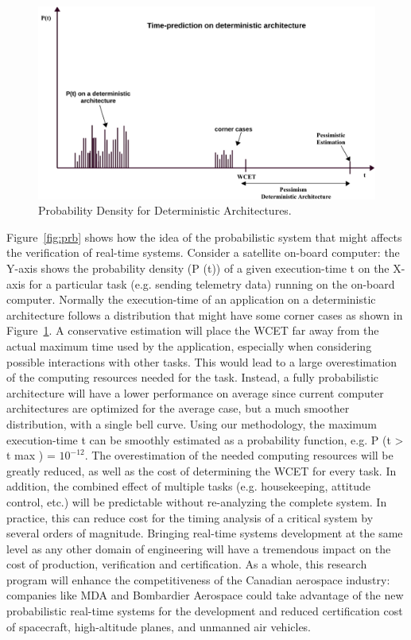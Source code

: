 \begin{figure}[tb!]

   \includegraphics[scale=0.77]{figures/pta-det.pdf}
   \caption{Probability Density for Deterministic Architectures.}
\label{fig:det}
\end{figure}






Figure~\ref{fig:prb} shows how the idea of the probabilistic system that might affects the verification of real-time systems. Consider a satellite on-board computer: the Y-axis shows the probability density (P (t)) of a given execution-time t on
the X-axis for a particular task (e.g. sending telemetry data) running on the on-board computer. Normally
the execution-time of an application on a deterministic architecture follows a distribution that might have
some corner cases as shown in Figure~\ref{fig:det}. A conservative estimation will place the WCET far away from the actual maximum
time used by the application, especially when considering possible interactions with other tasks. This would
lead to a large overestimation of the computing resources needed for the task. Instead, a fully probabilistic
architecture will have a lower performance on average since current computer architectures are optimized
for the average case, but a much smoother distribution, with a single bell curve. Using our methodology, the
maximum execution-time t can be smoothly estimated as a probability function, e.g. P (t > t max ) = $10^{-12}$.
The overestimation of the needed computing resources will be greatly reduced, as well as the cost of determining the WCET for every task. In addition, the combined effect of multiple tasks (e.g. housekeeping,
attitude control, etc.) will be predictable without re-analyzing the complete system. In practice, this can
reduce cost for the timing analysis of a critical system by several orders of magnitude.
Bringing real-time systems development at the same level as any other domain of engineering will have
a tremendous impact on the cost of production, verification and certification. As a whole, this research
program will enhance the competitiveness of the Canadian aerospace industry: companies like MDA and
Bombardier Aerospace could take advantage of the new probabilistic real-time systems for the development
and reduced certification cost of spacecraft, high-altitude planes, and unmanned air vehicles.

